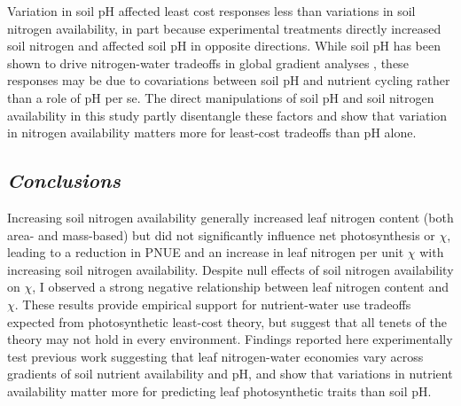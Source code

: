 Variation in soil pH affected least cost responses less than variations in soil nitrogen availability, in part because experimental treatments directly increased soil nitrogen and affected soil pH in opposite directions. While soil pH has been shown to drive nitrogen-water tradeoffs in global gradient analyses , these responses may be due to covariations between soil pH and nutrient cycling rather than a role of pH per se. The direct manipulations of soil pH and soil nitrogen availability in this study partly disentangle these factors and show that variation in nitrogen availability matters more for least-cost tradeoffs than pH alone.

\subsection{\textit{Conclusions}}
\noindent Increasing soil nitrogen availability generally increased leaf nitrogen content (both area- and mass-based) but did not significantly influence net photosynthesis or $\chi$, leading to a reduction in PNUE and an increase in leaf nitrogen per unit $\chi$ with increasing soil nitrogen availability. Despite null effects of soil nitrogen availability on $\chi$, I observed a strong negative relationship between leaf nitrogen content and $\chi$. These results provide empirical support for nutrient-water use tradeoffs expected from photosynthetic least-cost theory, but suggest that all tenets of the theory may not hold in every environment. Findings reported here experimentally test previous work suggesting that leaf nitrogen-water economies vary across gradients of soil nutrient availability and pH, and show that variations in nutrient availability matter more for predicting leaf photosynthetic traits than soil pH.
